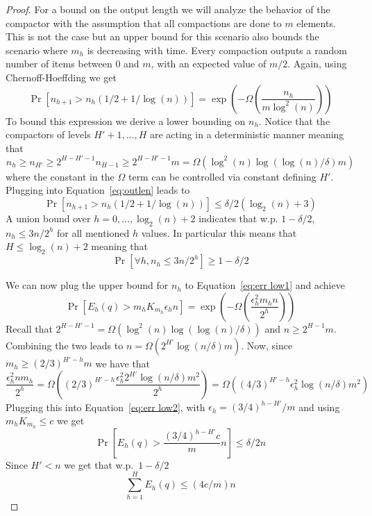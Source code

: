 \documentclass[anon,12pt]{colt2019} %
\newcommand{\eps}{\epsilon}
\renewcommand{\Pr}{\operatorname{Pr}}
\begin{document}
{\begin{proof}
For a bound on the output length we will analyze the behavior of the compactor with the assumption that all compactions are done to $m$ elements. This is not the case but an upper bound for this scenario also bounds the scenario where $m_h$ is decreasing with time. Every compaction outputs a random number of items between $0$ and $m$, with an expected value of $m/2$. Again, using Chernoff-Hoeffding we get
\begin{equation} \label{eq:outlen}
\Pr\left[ n_{h+1} > n_h(1/2+1/\log(n)) \right] = \exp \left( -\Omega\left( \frac{n_h}{m \log^2(n)} \right) \right) 
\end{equation}
To bound this expression we derive a lower bounding on $n_h$. Notice that the compactors of levels $H'+1,\ldots,H$ are acting in a deterministic manner meaning that 
$$n_h \geq n_{H'} \geq 2^{H-H'-1}n_{H-1} \geq 2^{H-H'-1}m = \Omega(\log^2(n)\log(\log(n)/\delta)m)$$
where the constant in the $\Omega$ term can be controlled via constant defining $H'$. Plugging into Equation~\eqref{eq:outlen} leads to
\begin{equation*} 
\Pr\left[ n_{h+1} > n_h(1/2+1/\log(n)) \right] \leq \delta/2(\log_2(n)+3)
\end{equation*}
A union bound over $h=0,\ldots,\log_2(n)+2$ indicates that w.p. $1-\delta/2$, $n_h \leq 3n/2^h$ for all mentioned $h$ values. In particular this means that $H \leq \log_2(n)+2$ meaning that 
\begin{equation} \label{eq:outlen2}
\Pr\left[ \forall h, n_h \leq 3n/2^h \right] \geq 1-\delta/2
\end{equation}

We can now plug the upper bound for $n_h$ to Equation~\ref{eq:err low1} and achieve 
\begin{equation} \label{eq:err low2}
\Pr\left[ E_h(q) > m_h K_{m_h} \eps_h n \right] = \exp \left( -\Omega\left( \frac{\eps_h^2 m_h n}{2^h} \right) \right)
\end{equation}
Recall that $2^{H-H'-1} = \Omega(\log^2(n)\log(\log(n)/\delta))$ and $n \geq 2^{H-1}m$. Combining the two leads to $n = \Omega(2^{H'}\log(n/\delta)m)$. Now, since $m_h \geq (2/3)^{H'-h}m$ we have that
$$
\frac{\eps_h^2 n m_h}{2^h} = \Omega\left( (2/3)^{H'-h} \frac{\eps_h^2 2^{H'} \log(n/\delta) m^2}{2^h} \right) = \Omega\left( (4/3)^{H'-h} \eps_h^2 \log(n/\delta) m^2 \right)
$$
Plugging this into Equation~\eqref{eq:err low2}, with $\eps_h = (3/4)^{h-H'}/m$ and using $m_h K_{m_h} \leq c$ we get
\begin{equation} \label{eq:err low3}
\Pr\left[ E_h(q) > \frac{(3/4)^{h-H'} c}{m} n \right]  \leq \delta/2n
\end{equation}
Since $H' < n$ we get that w.p.\ $1-\delta/2$
$$ \sum_{h=1}^H E_h(q) \leq (4c/m) n $$


\end{proof}}
\end{document}
